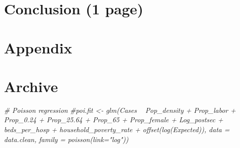 \documentclass[]{article}
\newenvironment{Shaded}{\begin{snugshade}}{\end{snugshade}}
\newcommand{\CommentTok}[1]{\textcolor[rgb]{0.56,0.35,0.01}{\textit{#1}}}
\begin{document}
\hypertarget{conclusion-1-page}{%
\section{Conclusion (1 page)}\label{conclusion-1-page}}

\hypertarget{appendix}{%
\section{Appendix}\label{appendix}}

\hypertarget{archive}{%
\section{Archive}\label{archive}}

\begin{Shaded}
\begin{Highlighting}[]
\CommentTok{# Poisson regression}
\CommentTok{#poi.fit <- glm(Cases ~ Pop_density + Prop_labor + Prop_0.24 + Prop_25.64 + Prop_65 + Prop_female +  Log_postsec +  beds_per_hosp  + household_poverty_rate + offset(log(Expected)), data = data.clean, family = poisson(link="log"))}
\end{Highlighting}
\end{Shaded}
\end{document}
